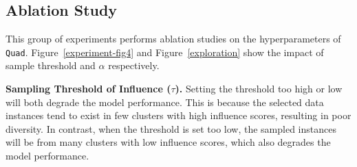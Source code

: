 \documentclass{article} %
\begin{document}

\subsection{Ablation Study}
This group of experiments performs ablation studies on the hyperparameters of \texttt{Quad}. Figure~\ref{experiment-fig4} and Figure~\ref{exploration} show the impact of sample threshold and $\alpha$ respectively.


\textbf{Sampling Threshold of Influence ($\tau$).}
 Setting the threshold too high or low will both degrade the model performance.  This is because the selected data instances tend to exist in few clusters with high influence scores, resulting in poor diversity. In contrast, when the threshold is set too low, the sampled instances will be from many clusters with low influence scores, which also degrades the model performance. %


\end{document}
